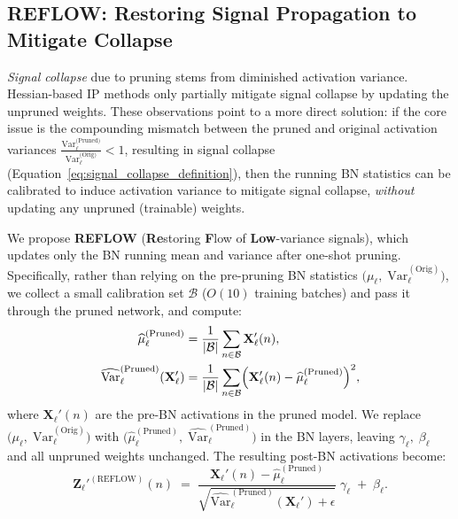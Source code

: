 \subsection{REFLOW: Restoring Signal Propagation to Mitigate Collapse}

\emph{Signal collapse} due to pruning stems from diminished activation variance. Hessian-based IP methods only partially mitigate signal collapse by updating the unpruned weights. These observations point to a more direct solution: if the core issue is the compounding mismatch between the pruned and original activation variances \(\frac{\mathrm{Var}_\ell^{\text{(Pruned)}}}{\mathrm{Var}_\ell^{\text{(Orig)}}} < 1\), resulting in signal collapse (Equation~\ref{eq:signal_collapse_definition}), then the running BN statistics can be calibrated to induce activation variance to mitigate signal collapse,  \emph{without} updating any unpruned (trainable) weights.


We propose \textbf{REFLOW} (\textbf{Re}storing \textbf{F}low of \textbf{Low}-variance signals), which updates only the BN running mean and variance after one-shot pruning. Specifically, rather than relying on the pre-pruning BN statistics $\bigl(\mu_\ell,\;\mathrm{Var}_\ell^{(\text{Orig})}\bigr)$, we collect a small calibration set $\mathcal{B}$ ($O(10)$ training batches) and pass it through the pruned network, and compute:
\begin{align}
\widehat{\mu}_\ell^{(\text{Pruned})}
  &= \frac{1}{|\mathcal{B}|} \sum_{n \in \mathcal{B}} \mathbf{X}_\ell'(n), \\
\widehat{\mathrm{Var}}_\ell^{(\text{Pruned})}(\mathbf{X}_\ell')
  &= \frac{1}{|\mathcal{B}|} \sum_{n \in \mathcal{B}}
    \Bigl(\mathbf{X}_\ell'(n) - \widehat{\mu}_\ell^{(\text{Pruned})}\Bigr)^2,
  \label{eq:reflow_calib}
\end{align}
where $\mathbf{X}_\ell'(n)$ are the pre-BN activations in the pruned model. We replace 
$\bigl(\mu_\ell,\;\mathrm{Var}_\ell^{(\text{Orig})}\bigr)$
with $\bigl(\widehat{\mu}_\ell^{(\text{Pruned})},\;\widehat{\mathrm{Var}}_\ell^{(\text{Pruned})}\bigr)$ in the BN layers, leaving $\gamma_\ell,\;\beta_\ell$ and all unpruned weights unchanged. The resulting post-BN activations become:
\begin{equation}
  \mathbf{Z}_\ell'^{(\text{REFLOW})}(n)
  \;=\;
  \frac{\mathbf{X}_\ell'(n) - \widehat{\mu}_\ell^{(\text{Pruned})}}
       {\sqrt{\widehat{\mathrm{Var}}_\ell^{(\text{Pruned})}(\mathbf{X}_\ell') + \epsilon}}
  \;\gamma_\ell \;+\; \beta_\ell.
  \label{eq:reflow_transform}
\end{equation}

